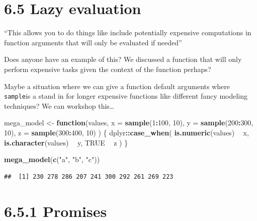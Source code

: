 \documentclass[]{book}
\newenvironment{Shaded}{\begin{snugshade}}{\end{snugshade}}
\newcommand{\ControlFlowTok}[1]{\textcolor[rgb]{0.13,0.29,0.53}{\textbf{#1}}}
\newcommand{\DataTypeTok}[1]{\textcolor[rgb]{0.13,0.29,0.53}{#1}}
\newcommand{\DecValTok}[1]{\textcolor[rgb]{0.00,0.00,0.81}{#1}}
\newcommand{\KeywordTok}[1]{\textcolor[rgb]{0.13,0.29,0.53}{\textbf{#1}}}
\newcommand{\NormalTok}[1]{#1}
\newcommand{\OperatorTok}[1]{\textcolor[rgb]{0.81,0.36,0.00}{\textbf{#1}}}
\newcommand{\OtherTok}[1]{\textcolor[rgb]{0.56,0.35,0.01}{#1}}
\newcommand{\StringTok}[1]{\textcolor[rgb]{0.31,0.60,0.02}{#1}}
\begin{document}
\hypertarget{lazy-evaluation}{%
\section*{6.5 Lazy evaluation}\label{lazy-evaluation}}

``This allows you to do things like include potentially expensive computations in function arguments that will only be evaluated if needed''

Does anyone have an example of this? We discussed a function that will only perform expensive tasks given the context of the function perhaps?

Maybe a situation where we can give a function default arguments where \texttt{sample}is a stand in for longer expensive functions like different fancy modeling techniques? We can workshop this\ldots{}

\begin{Shaded}
\begin{Highlighting}[]
\NormalTok{mega_model <-}\StringTok{ }\ControlFlowTok{function}\NormalTok{(values, }\DataTypeTok{x =} \KeywordTok{sample}\NormalTok{(}\DecValTok{1}\OperatorTok{:}\DecValTok{100}\NormalTok{, }\DecValTok{10}\NormalTok{), }\DataTypeTok{y =} \KeywordTok{sample}\NormalTok{(}\DecValTok{200}\OperatorTok{:}\DecValTok{300}\NormalTok{, }\DecValTok{10}\NormalTok{), }\DataTypeTok{z =} \KeywordTok{sample}\NormalTok{(}\DecValTok{300}\OperatorTok{:}\DecValTok{400}\NormalTok{, }\DecValTok{10}\NormalTok{)}
\NormalTok{) \{}
\NormalTok{  dplyr}\OperatorTok{::}\KeywordTok{case_when}\NormalTok{(}
    \KeywordTok{is.numeric}\NormalTok{(values) }\OperatorTok{~}\StringTok{ }\NormalTok{x,}
    \KeywordTok{is.character}\NormalTok{(values) }\OperatorTok{~}\StringTok{ }\NormalTok{y,}
    \OtherTok{TRUE} \OperatorTok{~}\StringTok{ }\NormalTok{z}
\NormalTok{  )}
\NormalTok{\}}

\KeywordTok{mega_model}\NormalTok{(}\KeywordTok{c}\NormalTok{(}\StringTok{"a"}\NormalTok{, }\StringTok{"b"}\NormalTok{, }\StringTok{"c"}\NormalTok{))}
\end{Highlighting}
\end{Shaded}

\begin{verbatim}
##  [1] 230 278 286 207 241 300 292 261 269 223
\end{verbatim}

\hypertarget{promises}{%
\section*{6.5.1 Promises}\label{promises}}
\end{document}

